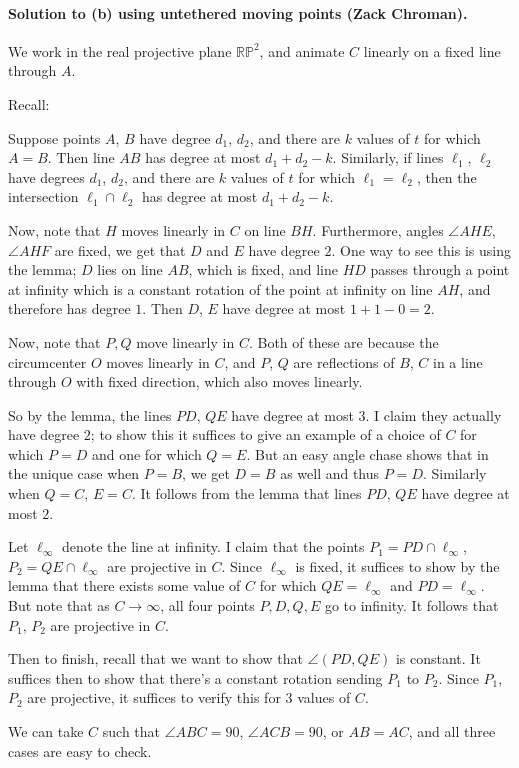 \paragraph{Solution to (b) using untethered moving points (Zack Chroman).}
We work in the real projective plane $\mathbb{RP}^2$,
and animate $C$ linearly on a fixed line through $A$.

Recall:
\begin{lemma*}
  Suppose points $A$, $B$ have degree $d_1$, $d_2$,
  and there are $k$ values of $t$ for which $A=B$.
  Then line $AB$ has degree at most $d_1+d_2-k$.
  Similarly, if lines $\ell_1$, $\ell_2$ have degrees $d_1$, $d_2$,
  and there are $k$ values of $t$ for which $\ell_1=\ell_2$,
  then the intersection $\ell_1 \cap \ell_2$ has degree at most $d_1+d_2-k$.
\end{lemma*}

Now, note that $H$ moves linearly in $C$ on line $BH$.
Furthermore, angles $\angle AHE$, $\angle AHF$ are fixed,
we get that $D$ and $E$ have degree $2$.
One way to see this is using the lemma; $D$ lies on line $AB$,
which is fixed, and line $HD$ passes through a point at infinity
which is a constant rotation of the point at infinity on line $AH$,
and therefore has degree $1$.
Then $D$, $E$ have degree at most $1+1-0=2$.

Now, note that $P,Q$ move linearly in $C$.
Both of these are because the circumcenter $O$ moves linearly in $C$,
and $P$, $Q$ are reflections of $B$, $C$ in a
line through $O$ with fixed direction, which also moves linearly.

So by the lemma, the lines $PD$, $QE$ have degree at most $3$.
I claim they actually have degree $2$;
to show this it suffices to give an example of a choice of $C$
for which $P=D$ and one for which $Q=E$.
But an easy angle chase shows that in the unique case when $P=B$,
we get $D=B$ as well and thus $P=D$. Similarly when $Q=C$, $E=C$.
It follows from the lemma that lines $PD$, $QE$ have degree at most $2$.

Let $\ell_\infty$ denote the line at infinity.
I claim that the points $P_1=PD \cap \ell_\infty$,
$P_2=QE \cap \ell_\infty$ are projective in $C$.
Since $\ell_\infty$ is fixed, it suffices to show by the lemma that there
exists some value of $C$ for which $QE=\ell_\infty$ and $PD = \ell_\infty$.
But note that as $C \to \infty$, all four points $P,D,Q,E$ go to infinity.
It follows that $P_1$, $P_2$ are projective in $C$.

Then to finish,
recall that we want to show that $\angle (PD, QE)$ is constant.
It suffices then to show that there's a constant rotation
sending $P_1$ to $P_2$. Since $P_1$, $P_2$ are projective,
it suffices to verify this for $3$ values of $C$.

We can take $C$ such that $\angle ABC=90$, $\angle ACB = 90$,
or $AB=AC$, and all three cases are easy to check.
